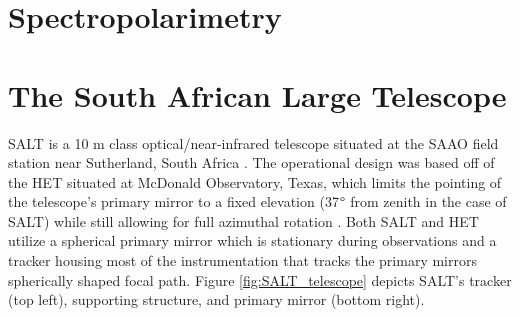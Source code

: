 

\section{Spectropolarimetry} %



\section{The South African Large Telescope} %

\gls{SALT} is a 10 m class optical/near-infrared telescope situated at the \gls{SAAO} field station near Sutherland, South Africa \citep{SALT_optical_design}. The operational design was based off of the \gls{HET} situated at McDonald Observatory, Texas, which limits the pointing of the telescope's primary mirror to a fixed elevation (37$\degree$ from zenith in the case of SALT) while still allowing for full azimuthal rotation \citep{HET}. Both SALT and HET utilize a spherical primary mirror which is stationary during observations and a tracker housing most of the instrumentation that tracks the primary mirrors spherically shaped focal path. Figure \ref{fig:SALT_telescope} depicts \gls{SALT}'s tracker (top left), supporting structure, and primary mirror (bottom right).

